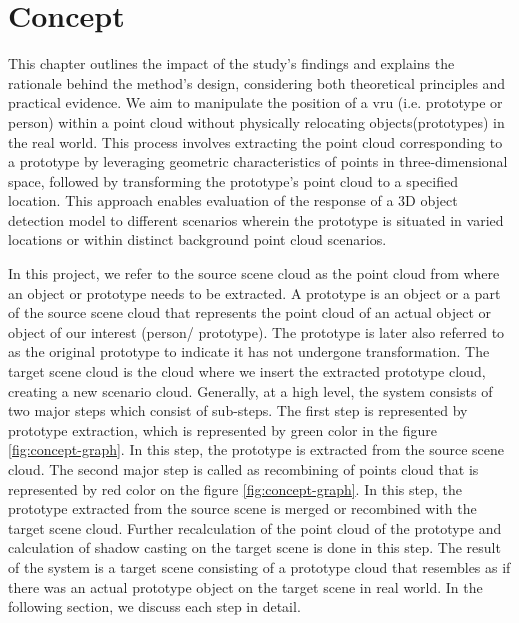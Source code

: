 \chapter{Concept}

This chapter outlines the impact of the study's findings and explains the rationale behind the method's design, considering both theoretical principles and practical evidence. 
We aim to manipulate the position of a \acrshort{vru} (i.e. prototype or person) within a point cloud without physically relocating objects(prototypes) in the real world. This process involves extracting the point cloud corresponding to a prototype by leveraging geometric characteristics of points in three-dimensional space, followed by transforming the prototype's point cloud to a specified location. This approach enables evaluation of the response of a 3D object detection model to different scenarios wherein the prototype is situated in varied locations or within distinct background point cloud scenarios.

In this project, we refer to the source scene cloud as the point cloud from where an object or prototype needs to be extracted. A prototype is an object or a part of the source scene cloud that represents the point cloud of an actual object or object of our interest (person/ prototype). The prototype is later also referred to as the original prototype to indicate it has not undergone transformation. The target scene cloud is the cloud where we insert the extracted prototype cloud, creating a new scenario cloud. Generally, at a high level, the system consists of two major steps which consist of sub-steps. The first step is represented by prototype extraction, which is represented by green color in the figure \ref{fig:concept-graph}. In this step, the prototype is extracted from the source scene cloud. The second major step is called as recombining of points cloud that is represented by red color on the figure \ref{fig:concept-graph}. In this step, the prototype extracted from the source scene is merged or recombined with the target scene cloud. Further recalculation of the point cloud of the prototype and calculation of shadow casting on the target scene is done in this step. The result of the system is a target scene consisting of a prototype cloud that resembles as if there was an actual prototype object on the target scene in real world. In the following section, we discuss each step in detail.

